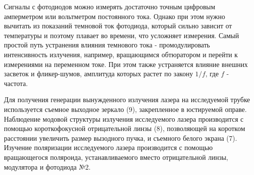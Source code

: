 \documentclass[a4paper,12pt]{article}
\begin{document}
Сигналы с фотодиодов можно измерять достаточно точным цифровым амперметром или вольтметром постоянного тока. Однако при этом нужно вычитать из показаний темновой ток фотодиода, который сильно зависит от температуры и поэтому плавает во времени, что усложняет измерения. Самый простой путь устранения влияния темнового тока - промодулировать интенсивность излучения, например, вращающимся обтюратором и перейти к измерениями на переменном токе. При этом также устраняется влияние внешних засветок и фликер-шумов, амплитуда которых растет по закону $1/f$, где $f$ - частота.

Для получения генерации вынужденного излучения лазера на исследуемой трубке используется съемное выходное зеркало (9), закрепленное в юстируемой оправе. Наблюдение модовой структуры излучения исследуемого лазера производится с помощью короткофокусной отрицательной линзы (8), позволяющей на коротком расстоянии увеличить размер вызодного пучка, и съемного белого экрана (7). Изучение поляризации исследуемого лазера производится с помощью вращающегося поляроида, устанавливаемого вместо отрицательной линзы, модулятора и фотодиода №2.

\newpage
\end{document}
